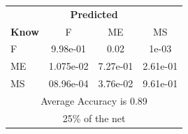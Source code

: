 \documentclass[12pt]{article} %
\begin{document}
\begin{minipage}{0.5\textwidth}
\begin{center}
\begin{tabular}{l|c|c|c|}
 \multicolumn{4}{c}{ \textbf{ Predicted}}\\
 \textbf{Know}&F&ME&MS\\ \hline\hline
F   &9.98e-01&0.02&1e-03\\
ME &1.075e-02&7.27e-01&2.61e-01\\
MS &08.96e-04&3.76e-02&9.61e-01\\
\multicolumn{4}{c}{Average Accuracy is 0.89}\\
\multicolumn{4}{c}{25\%  of the net}\\
\end{tabular}
\end{center}
\end{minipage}
\end{document}
